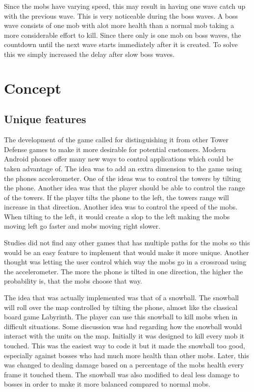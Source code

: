 Since the mobs have varying speed, this may result in having one wave catch up with the previous wave. This is very noticeable during the boss waves. A boss wave consists of one mob with alot more health than a normal mob taking a more considerable effort to kill. Since there only is one mob on boss waves, the countdown until the next wave starts immediately after it is created. To solve this we simply increased the delay after slow boss waves.
\section{Concept}
\subsection{Unique features}

The development of the game called for distinguishing it from other Tower Defense games to make it more desirable for potential customers. Modern Android phones offer many new ways to control applications which could be taken advantage of. The idea was to add an extra dimension to the game using the phones accelerometer. One of the ideas was to control the towers by tilting the phone. Another idea was that the player should be able to control the range of the towers. If the player tilts the phone to the left, the towers range will increase in that direction. Another idea was to control the speed of the mobs. When tilting to the left, it would create a slop to the left making the mobs moving left go faster and mobs moving right slower. 

Studies did not find any other games that has multiple paths for the mobs so this would be an easy feature to implement that would make it more unique. Another thought was letting the user control which way the mobs go in a crossroad using the accelerometer. The more the phone is tilted in one direction, the higher the probability is, that the mobs choose that way.

The idea that was actually implemented was that of a snowball. The snowball will roll over the map controlled by tilting the phone, almost like the classical board game Labyrinth. The player can use this snowball to kill mobs when in difficult situations. Some discussion was had regarding how the snowball would interact with the units on the map. Initially it was designed to kill every mob it touched. This was the easiest way to code it but it made the snowball too good, especially against bosses who had much more health than other mobs. Later, this was changed to dealing damage based on a percentage of the mobs health every frame it touched them. The snowball was also modified to deal less damage to bosses in order to make it more balanced compared to normal mobs. 

